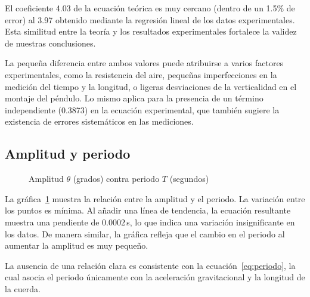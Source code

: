 \documentclass[letterpaper]{report}
\numberwithin{table}{section}
\begin{document}
El coeficiente 4.03 de la ecuación teórica es muy cercano (dentro de
un 1.5\% de error) al 3.97 obtenido mediante la regresión lineal de los datos
experimentales. Esta similitud entre la teoría y los resultados
experimentales fortalece la validez de nuestras conclusiones.

La pequeña diferencia entre ambos valores puede atribuirse a varios factores
experimentales, como la resistencia del aire, pequeñas imperfecciones en la
medición del tiempo y la longitud, o ligeras desviaciones de la verticalidad en
el montaje del péndulo. Lo mismo aplica para la presencia de un término
independiente (0.3873) en la ecuación experimental, que también sugiere la
existencia de errores sistemáticos en las mediciones.

\subsection{Amplitud y periodo}

\begin{figure}[ht]
  \centering
  \caption{Amplitud $\theta$ (grados) contra periodo $T$
  (segundos)}\label{fig:amplitud_periodo}
\end{figure}

La gráfica~\ref{fig:amplitud_periodo} muestra la relación entre la
amplitud y el periodo. La variación entre los puntos es mínima. Al
añadir una línea de tendencia, la ecuación resultante muestra una
pendiente de $0.0002$\,s, lo que indica una variación insignificante
en los datos. De manera similar, la gráfica refleja que el cambio en
el periodo al aumentar la amplitud es muy pequeño.

La ausencia de una relación clara es consistente con la
ecuación~\eqref{eq:periodo}, la cual asocia el periodo únicamente con la
aceleración gravitacional y la longitud de la cuerda.
\end{document}
